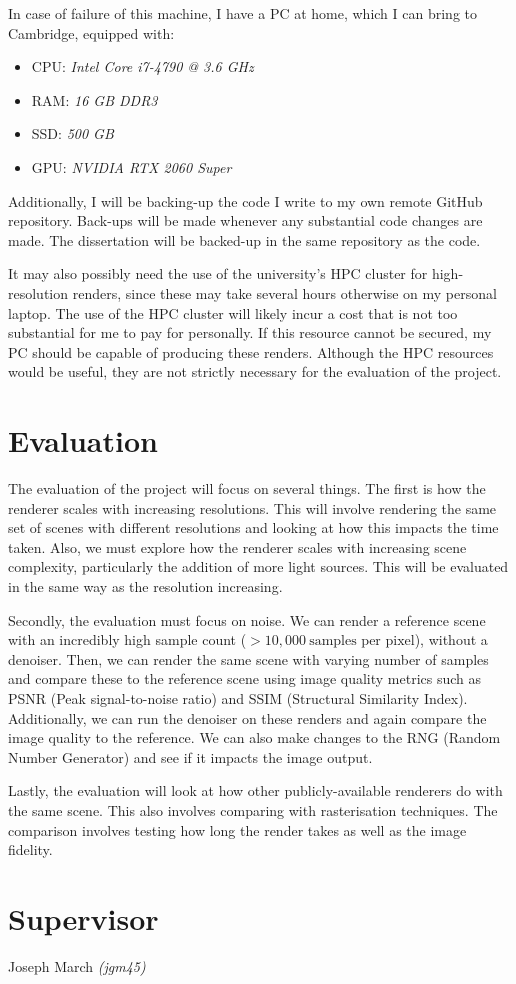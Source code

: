 \documentclass[12pt, a4paper]{article}
\begin{document}
    In case of failure of this machine, I have a PC at home, which I can bring to Cambridge, equipped with:
    \begin{itemize}
        \setlength\itemsep{0.1em}
        \item CPU: \emph{Intel Core i7-4790 @ 3.6 GHz}
        \item RAM: \emph{16 GB DDR3}
        \item SSD: \emph{500 GB}
        \item GPU: \emph{NVIDIA RTX 2060 Super}
    \end{itemize}

    Additionally, I will be backing-up the code I write to my own remote GitHub repository. Back-ups will be made whenever any substantial code changes are made. The dissertation will be backed-up in the same repository as the code.

    It may also possibly need the use of the university’s HPC cluster for high-resolution renders, since these may take several hours otherwise on my personal laptop. The use of the HPC cluster will likely incur a cost that is not too substantial for me to pay for personally. If this resource cannot be secured, my PC should be capable of producing these renders. Although the HPC resources would be useful, they are not strictly necessary for the evaluation of the project.

    \section*{Evaluation}
    The evaluation of the project will focus on several things. The first is how the renderer scales with increasing resolutions. This will involve rendering the same set of scenes with different resolutions and looking at how this impacts the time taken. Also, we must explore how the renderer scales with increasing scene complexity, particularly the addition of more light sources. This will be evaluated in the same way as the resolution increasing.

    Secondly, the evaluation must focus on noise. We can render a reference scene with an incredibly high sample count ($>\!\!\!10,000\  \textrm{samples per pixel}$), without a denoiser. Then, we can render the same scene with varying number of samples and compare these to the reference scene using image quality metrics such as PSNR (Peak signal-to-noise ratio) and SSIM (Structural Similarity Index). Additionally, we can run the denoiser on these renders and again compare the image quality to the reference. We can also make changes to the RNG (Random Number Generator) and see if it impacts the image output.

    Lastly, the evaluation will look at how other publicly-available renderers do with the same scene. This also involves comparing with rasterisation techniques. The comparison involves testing how long the render takes as well as the image fidelity.

    \section*{Supervisor}
    Joseph March \emph{(jgm45)}
\end{document}
